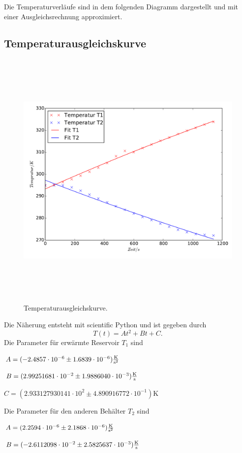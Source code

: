 Die Temperaturverläufe sind in dem folgenden Diagramm dargestellt und mit einer
Ausgleichsrechnung approximiert.
\subsection{Temperaturausgleichskurve}
\begin{figure}
\includegraphics[height=13cm]{Temperaturgraphik.pdf}
\caption{Temperaturausgleichskurve.}
\end{figure}

Die Näherung entsteht mit scientific Python und ist gegeben durch
\begin{equation}
  T(t)=At^2+Bt+C .
\end{equation}
Die Parameter für erwärmte Reservoir $T_1$ sind

  $A=(-2.4857\cdot10^{-6}\pm1.6839\cdot10^{-6})\si{\frac{\kelvin}{\second^2}} $

  $B=(2.99251681\cdot10^{-2}\pm1.9886040\cdot10^{-3})\si{\frac{\kelvin}{\second}}$

  $C=(2.933127930141\cdot10^{2}\pm4.890916772\cdot10^{-1})\si{\kelvin}$

Die Parameter für den anderen Behälter $T_2$ sind

  $A=(2.2594\cdot10^{-6}\pm2.1868\cdot10^{-6})\si{\frac{\kelvin}{\second^2}}$

  $B=(-2.6112098\cdot10^{-2}\pm2.5825637\cdot10^{-3})\si{\frac{\kelvin}{\second}}$


